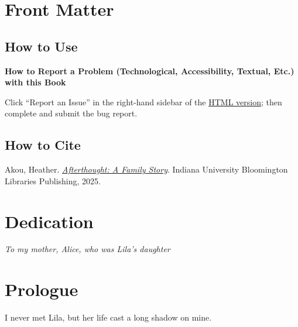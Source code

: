 \documentclass[
  letterpaper,
]{book}
\renewcommand*\contentsname{Table of contents}
\newcommand\contentsname{Table of contents}
\begin{document}

\renewcommand*\contentsname{Table of Contents}
{
\hypersetup{linkcolor=blue}
\setcounter{tocdepth}{2}
\tableofcontents
}
\listoffigures

\mainmatter
{}

\chapter{Front Matter}\label{front-matter}

\section{How to Use}\label{how-to-use}

\textbf{How to Report a Problem (Technological, Accessibility, Textual,
Etc.) with this Book}

Click ``Report an Issue'' in the right-hand sidebar of the
\href{https://iulibscholcomm.github.io/afterthought/}{HTML version};
then complete and submit the bug report.

\section{How to Cite}\label{how-to-cite}

Akou, Heather.
\href{https://doi.org/10.5967/rc90-k143}{\emph{Afterthought: A Family
Story}}. Indiana University Bloomington Libraries Publishing, 2025.


\chapter{Dedication}\label{dedication}

\emph{To my mother, Alice, who was Lila's daughter}


\chapter{Prologue}\label{prologue}

I never met Lila, but her life cast a long shadow on mine.
\end{document}
